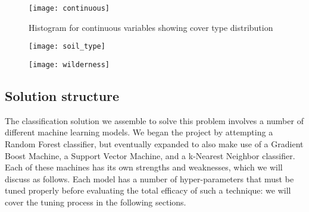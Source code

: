 \begin{figure*}
\centering
\texttt{[image: continuous]}
 \caption{Histogram for continuous variables showing cover type distribution}
 \label{fig:continuous_features}
\end{figure*}

\begin{figure*}[b]
\centering
\begin{minipage}{.5\textwidth}
  \centering
  \texttt{[image: soil\_type]}
  \label{fig:soil}
\end{minipage}%
\begin{minipage}{.5\textwidth}
  \centering
  \texttt{[image: wilderness]}
  \label{fig:wilderness}
\end{minipage}
\end{figure*}



\subsection{Solution structure}
The classification solution we assemble to solve this problem involves 
a number of different machine learning models.  We began the project by 
attempting a Random Forest classifier, but eventually expanded to also 
make use of a Gradient Boost Machine, a Support Vector Machine, and a 
k-Nearest Neighbor classifier.  Each of these machines has its own 
strengths and weaknesses, which we will discuss as follows.  Each model 
has a number of hyper-parameters that must be tuned properly before 
evaluating the total efficacy of such a technique: we will cover the 
tuning process in the following sections.

